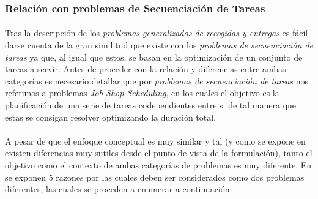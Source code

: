 \documentclass{subfiles}
\begin{document}
        \subsubsection{Relación con problemas de Secuenciación de Tareas}
        \label{sec:routing_problems_vs_job_shop_scheduling}

          \paragraph{}
          Tras la descripción de los \emph{problemas generalizados de recogidas y entregas} es fácil darse cuenta de la gran similitud que existe con los \emph{problemas de secuenciación de tareas} ya que, al igual que estos, se basan en la optimización de un conjunto de tareas a servir. Antes de proceder con la relación y diferencias entre ambas categorías es necesario detallar que por \emph{problemas de secuenciación de tareas} nos referimos a problemas \emph{Job-Shop Scheduling}, en los cuales el objetivo es la planificación de una serie de tareas codependientes entre si de tal manera que estas se consigan resolver optimizando la duración total.

          \paragraph{}
          A pesar de que el enfoque conceptual es muy similar y tal (y como se expone en \cite{beck2003vehicle} existen diferencias muy sutiles desde el punto de vista de la formulación), tanto el objetivo como el contexto de ambas categorías de problemas es muy diferente. En \cite{beck2003vehicle} se exponen $5$ razones por las cuales deben ser considerados como dos problemas diferentes, las cuales se proceden a enumerar a continuación:
\end{document}
